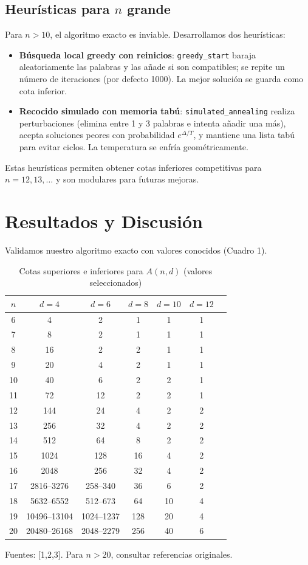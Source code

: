 \documentclass[12pt, spanish]{article}
\begin{document}
\subsection{Heurísticas para $n$ grande}
Para $n>10$, el algoritmo exacto es inviable. Desarrollamos dos heurísticas:
\begin{itemize}
\item \textbf{Búsqueda local greedy con reinicios}: \texttt{greedy\_start} baraja aleatoriamente las palabras y las añade si son compatibles; se repite un número de iteraciones (por defecto 1000). La mejor solución se guarda como cota inferior.
\item \textbf{Recocido simulado con memoria tabú}: \texttt{simulated\_annealing} realiza perturbaciones (elimina entre 1 y 3 palabras e intenta añadir una más), acepta soluciones peores con probabilidad $e^{\Delta/T}$, y mantiene una lista tabú para evitar ciclos. La temperatura se enfría geométricamente.
\end{itemize}
Estas heurísticas permiten obtener cotas inferiores competitivas para $n=12,13,\dots$ y son modulares para futuras mejoras.

\section{Resultados y Discusión}
Validamos nuestro algoritmo exacto con valores conocidos (Cuadro 1).

\begin{table}
\centering
\caption{Cotas superiores e inferiores para $A(n,d)$ (valores seleccionados)}
\label{tab:binary_bounds}
\small
\begin{tabular}{c|cccccc}
\toprule
$n$ & $d=4$ & $d=6$ & $d=8$ & $d=10$ & $d=12$ \\
\midrule
6  & 4 & 2 & 1 & 1 & 1 \\
7  & 8 & 2 & 1 & 1 & 1 \\
8  & 16 & 2 & 2 & 1 & 1 \\
9  & 20 & 4 & 2 & 1 & 1 \\
10 & 40 & 6 & 2 & 2 & 1 \\
11 & 72 & 12 & 2 & 2 & 1 \\
12 & 144 & 24 & 4 & 2 & 2 \\
13 & 256 & 32 & 4 & 2 & 2 \\
14 & 512 & 64 & 8 & 2 & 2 \\
15 & 1024 & 128 & 16 & 4 & 2 \\
16 & 2048 & 256 & 32 & 4 & 2 \\
17 & 2816--3276 & 258--340 & 36 & 6 & 2 \\
18 & 5632--6552 & 512--673 & 64 & 10 & 4 \\
19 & 10496--13104 & 1024--1237 & 128 & 20 & 4 \\
20 & 20480--26168 & 2048--2279 & 256 & 40 & 6 \\
\bottomrule
\end{tabular}
\smallskip
\parbox{0.9\linewidth}{\small Fuentes: [1,2,3]. Para $n>20$, consultar referencias originales.}
\end{table}
\end{document}
